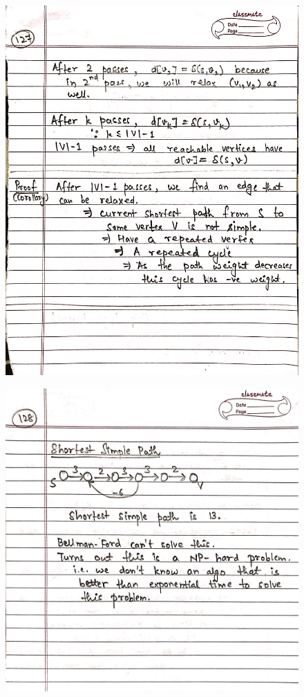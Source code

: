 \begin{figure}[H]
    \centering
    \includegraphics[scale=0.25]{"./MIT-6.006/MIT-6006-127"}
\end{figure}
\newpage
\begin{figure}[H]
    \centering
    \includegraphics[scale=0.25]{"./MIT-6.006/MIT-6006-128"}
\end{figure}
